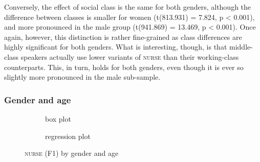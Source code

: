 Conversely, the effect of social class is the same for both genders, although the difference between classes is smaller for women (t(813.931) = 7.824, p < 0.001), and more pronounced in the male group (t(941.869) = 13.469, p < 0.001).
Once again, however, this distinction is rather fine-grained as class differences are highly significant for both genders.
What is interesting, though, is that middle-class speakers actually use lower variants of \textsc{nurse} than their working-class counterparts.
This, in turn, holds for both genders, even though it is ever so slightly more pronounced in the male sub-sample.

\subsubsection{Gender and age}
\label{sec.prod.res.vow.nurse.f1.genderage}

\begin{figure}
	
	\begin{subfigure}{.49\textwidth}
		
			\resizebox{\linewidth}{!}{} 
		\caption{box plot}
		\label{fig.box.f1w.nurse.genderage}
	\end{subfigure}
	\begin{subfigure}{.49\textwidth}
		
			\resizebox{\linewidth}{!}{} 
		\caption{regression plot}
		\label{fig.scatter.f1w.nurse.genderage}
	\end{subfigure}
	\caption{\textsc{nurse} (F1) by gender and age}
\end{figure}

